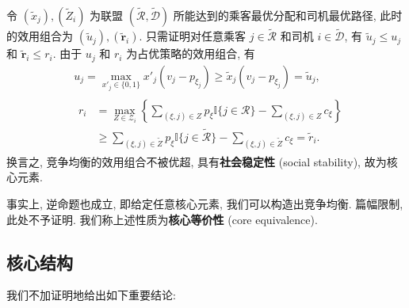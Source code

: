 \documentclass[10pt,twocolumn]{article}
\begin{document}
令 $(\tilde{x}_j), (\tilde{Z}_{i})$ 为联盟 $(\tilde{\mathcal{R}}, \tilde{\mathcal{D}})$ 所能达到的乘客最优分配和司机最优路径, 此时的效用组合为 $(\tilde{u}_j), (\tilde{\mathbf{r}}_i)$. 只需证明对任意乘客 $j\in\tilde{\mathcal{R}}$ 和司机 $i\in\tilde{\mathcal{D}}$, 有 $\tilde{u}_j \le u_j$ 和 $\tilde{\mathbf{r}}_i \le r_i$. 由于 $u_j$ 和 $r_i$ 为占优策略的效用组合, 有
$$
  \begin{aligned}
     & u_j = \max_{x'_j\in \{0,1\}} x'_j(v_j - p_{\xi_j}) \ge \tilde{x}_j(v_j - p_{\xi_j}) = \tilde{u}_j,                                                                            \\
     & \begin{aligned}
         r_i & = \max_{Z \in \mathcal{Z}_i} \left\{\sum_{(\xi, j)\in Z} p_\xi \mathbb{I}\{j\in \mathcal{R}\} - \sum_{(\xi, j)\in Z} c_\xi\right\} \\
             & \ge \sum_{(\xi, j)\in \tilde{Z}} p_\xi\mathbb{I}\{j\in \tilde{\mathcal{R}}\} - \sum_{(\xi, j)\in \tilde{Z}} c_\xi = \tilde{r}_i.
       \end{aligned}
  \end{aligned}
$$
换言之, 竞争均衡的效用组合不被优超, 具有\textbf{社会稳定性} (social stability), 故为核心元素.

事实上, 逆命题也成立, 即给定任意核心元素, 我们可以构造出竞争均衡. 篇幅限制, 此处不予证明. 我们称上述性质为\textbf{核心等价性} (core equivalence).

\subsection{核心结构}

我们不加证明地给出如下重要结论\citep{ma_spatio-temporal_2022}:
\end{document}
